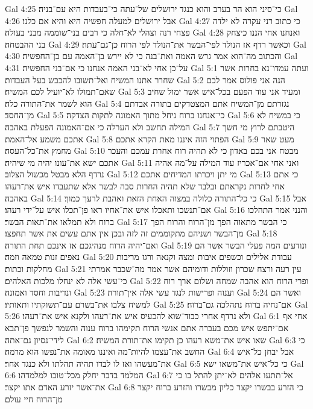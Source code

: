 Gal 4:25  כי־סיני הוא הר בערב והוא כנגד ירושלים של־עתה כי־בעבדות היא עם־בניה׃
Gal 4:26  אבל ירושלים למעלה חפשיה היא והיא אם כלנו׃
Gal 4:27  כי כתוב רני עקרה לא ילדה פצחי רנה וצהלי לא־חלה כי רבים בני־שוממה מבני בעולה׃
Gal 4:28  ואנחנו אחי הננו כיצחק בני ההבטחה׃
Gal 4:29  וכאשר רדף אז הנולד לפי־הבשר את־הנולד לפי הרוח כן־גם־עתה׃
Gal 4:30  והכתוב מה־הוא אמר גרש האמה ואת־בנה כי לא יירש בן־האמה עם בן־החפשיה׃
Gal 4:31  על־כן אחי לא־בני האמה אנחנו כי אם־בני החפשיה׃
Gal 5:1  ועתה עמדו־נא בחרות אשר שחרר אתנו המשיח ואל־תשובו להכבש בעל העבדות׃
Gal 5:2  הנה אני פולוס אמר לכם שאם־תמולו לא־יועיל לכם המשיח׃
Gal 5:3  ומעיד אני עוד הפעם בכל־איש אשר ימול שחיב הוא לשמר את־התורה כלה׃
Gal 5:4  נגזרתם מן־המשיח אתם המצטדקים בתורה אבדתם מן־החסד׃
Gal 5:5  כי־אנחנו ברוח ניחל מתוך האמונה לתקות הצדקה׃
Gal 5:6  כי במשיח לא המילה תחשב ולא הערלה כי אם־האמונה הפעלת באהבה׃
Gal 5:7  היטבתם לרוץ מי חשך אתכם משמע אל־האמת׃
Gal 5:8  הפתוי הזה איננו מאת הקרא אתכם׃
Gal 5:9  מעט שאר מחמץ את־כל־העסה׃
Gal 5:10  מבטח אני בכם באדון כי לא תהיה רוח אחרת עמכם והעכר אתכם ישא את־עונו יהיה מי שיהיה׃
Gal 5:11  ואני אחי אם־אכריז עוד המילה על־מה אהיה נרדף הלא מבטל מכשול הצלוב׃
Gal 5:12  מי יתן ויכרתו המדיחים אתכם׃
Gal 5:13  כי אתם אחי לחרות נקראתם ובלבד שלא תהיה החרות סבה לבשר אלא שתעבדו איש את־רעהו באהבה׃
Gal 5:14  כי כל־התורה כלולה במצוה האחת הזאת ואהבת לרעך כמוך׃
Gal 5:15  אבל אם־תנשכו ותאכלו איש את־אחיו ראו פן־תכלו איש על־ידי רעהו׃
Gal 5:16  והנני אמר התהלכו ברוח ולא תמלאו את־תאות הבשר׃
Gal 5:17  כי הבשר מתאוה הפך מן־הרוח והרוח הפך מן־הבשר ושניהם מתקוממים זה לזה ובכן אין אתם עשים את אשר תחפצו׃
Gal 5:18  ואם־יהיה הרוח מנהיגכם אז אינכם תחת התורה׃
Gal 5:19  ונודעים המה פעלי הבשר אשר הם נאפים זנות טמאה וזמה׃
Gal 5:20  עבודת אלילים וכשפים איבות ומצה וקנאה ורגז מריבות מחלקות וכתות׃
Gal 5:21  עין רעה ורצח שכרון וזוללות ודומיהם אשר אמר מה־שכבר אמרתי כי־עשי אלה לא ינחלו מלכות האלהים׃
Gal 5:22  ופרי הרוח הוא אהבה שמחה ושלום ארך רוח ונדיבות וחסד ואמונה׃
Gal 5:23  וענוה ופרישות לנגד עשי אלה אין־תורה׃
Gal 5:24  ואשר הם למשיח צלבו את־בשרם עם־תשוקתיו ותאותיו׃
Gal 5:25  אם־נחיה ברוח נתהלכה גם־ברוח׃
Gal 5:26  ולא נרדף אחרי כבוד־שוא להכעיס איש את־רעהו ולקנא איש את־רעהו׃
Gal 6:1  אחי אף אם־יתפש איש מכם בעברה אתם אנשי הרוח תקימהו ברוח ענוה והשמר לנפשך פן־תבא לידי־נסיון גם־אתה׃
Gal 6:2  שאו איש את־משא רעהו כן תקימו את־תורת המשיח׃
Gal 6:3  כי החשב את־עצמו להיות־מה ואיננו מאומה את־נפשו הוא מרמה׃
Gal 6:4  אבל יבחן כל־איש את־מעשהו ואז לו לבדו תהיה תהלתו ולא כנגד אחר׃
Gal 6:5  כי כל־איש את־משאו ישא׃
Gal 6:6  המלמד בדבר יחלק מכל־טובו למלמדהו׃
Gal 6:7  אל־תתעו אלהים לא־יתן להתל בו כי את־אשר יזרע האדם אתו יקצר׃
Gal 6:8  כי הזרע בבשרו יקצר כליון מבשרו והזרע ברוח יקצר מן־הרוח חיי עולם׃
